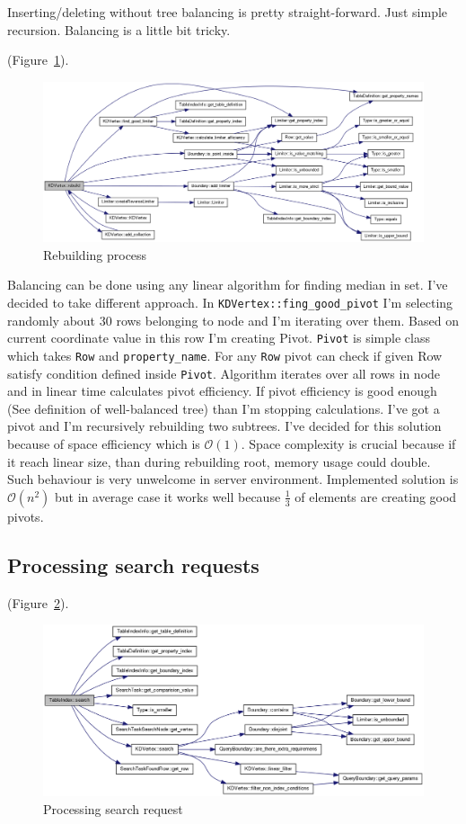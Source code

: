 \documentclass[10pt,a4paper]{article}
\newcommand{\Oh}{\mathcal{O}}
\begin{document}
Inserting/deleting without tree balancing is pretty straight-forward. Just simple recursion. Balancing is a little bit tricky. 

 (Figure~\ref{fig:rebuild}).

\begin{figure}
\centering
  \includegraphics[width=16cm]{rebuild}
  \caption{Rebuilding process}
  \label{fig:rebuild}
\end{figure}

Balancing can be done using any linear algorithm for finding median in set. I've decided to take different approach. In \verb|KDVertex::fing_good_pivot| I'm selecting randomly about 30 rows belonging to node and I'm iterating over them. Based on current coordinate value in this row I'm creating Pivot. \verb|Pivot| is simple class which takes \verb|Row| and \verb|property_name|. For any \verb|Row| pivot can check if given Row satisfy condition defined inside \verb|Pivot|. Algorithm iterates over all rows in node and in linear time calculates pivot efficiency. If pivot efficiency is good enough (See definition of well-balanced tree) than I'm stopping calculations. I've got a pivot and I'm recursively rebuilding two subtrees. I've decided for this solution because of space efficiency which is $\Oh(1)$. Space complexity is crucial because if it reach linear size, than during rebuilding root, memory usage could double. Such behaviour is very unwelcome in server environment. Implemented solution is $\Oh(n^2)$ but in average case it works well because $\frac{1}{3}$ of elements are creating good pivots.

\subsection{Processing search requests}

 (Figure~\ref{fig:search}).

\begin{figure}
\centering
  \includegraphics[width=16cm]{search}
  \caption{Processing search request}
  \label{fig:search}
\end{figure}
\end{document}
